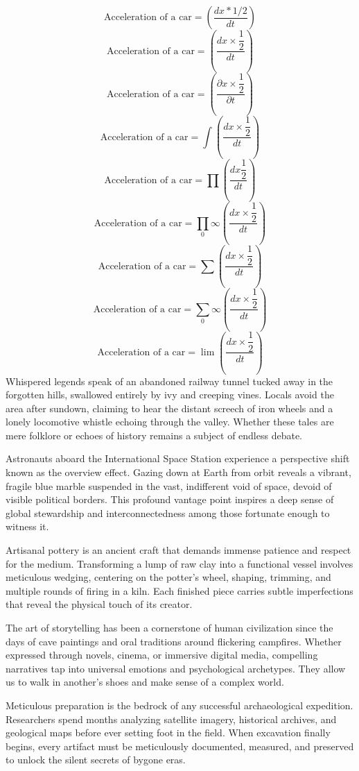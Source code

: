 \documentclass[12pt]{report} %
\begin{document}
\[\text{Acceleration of a car}=\left( \dfrac{dx*1/2}{dt}\right)\] 
\[\text{Acceleration of a car}=\left( \dfrac{dx\times\dfrac{1}{2}}{dt}\right)\] %
\vfill
\[\text{Acceleration of a car}=\left( \dfrac{\partial x\times\dfrac{1}{2}}{\partial t}\right)\] 
\[\text{Acceleration of a car}=\int\left( \dfrac{dx\times\dfrac{1}{2}}{dt}\right)\] 
\vfill
\[\text{Acceleration of a car}=\prod\left( \dfrac{dx\dfrac{1}{2}}{dt}\right)\] 
\[\text{Acceleration of a car}=\prod_{0}{\infty}\left( \dfrac{dx\times\dfrac{1}{2}}{dt}\right)\] 
\vfill
\[\text{Acceleration of a car}=\sum\left( \dfrac{dx\times\dfrac{1}{2}}{dt}\right)\] 
\[\text{Acceleration of a car}=\sum_{0}{\infty}\left( \dfrac{dx\times\dfrac{1}{2}}{dt}\right)\] 
\[\text{Acceleration of a car}=\lim\left( \dfrac{dx\times\dfrac{1}{2}}{dt}\right)\] 
Whispered legends speak of an abandoned railway tunnel tucked away in the forgotten hills, swallowed entirely by ivy and creeping vines. Locals avoid the area after sundown, claiming to hear the distant screech of iron wheels and a lonely locomotive whistle echoing through the valley. Whether these tales are mere folklore or echoes of history remains a subject of endless debate.

Astronauts aboard the International Space Station experience a perspective shift known as the overview effect. Gazing down at Earth from orbit reveals a vibrant, fragile blue marble suspended in the vast, indifferent void of space, devoid of visible political borders. This profound vantage point inspires a deep sense of global stewardship and interconnectedness among those fortunate enough to witness it.

Artisanal pottery is an ancient craft that demands immense patience and respect for the medium. Transforming a lump of raw clay into a functional vessel involves meticulous wedging, centering on the potter's wheel, shaping, trimming, and multiple rounds of firing in a kiln. Each finished piece carries subtle imperfections that reveal the physical touch of its creator.

The art of storytelling has been a cornerstone of human civilization since the days of cave paintings and oral traditions around flickering campfires. Whether expressed through novels, cinema, or immersive digital media, compelling narratives tap into universal emotions and psychological archetypes. They allow us to walk in another's shoes and make sense of a complex world.

Meticulous preparation is the bedrock of any successful archaeological expedition. Researchers spend months analyzing satellite imagery, historical archives, and geological maps before ever setting foot in the field. When excavation finally begins, every artifact must be meticulously documented, measured, and preserved to unlock the silent secrets of bygone eras.
\end{document}
